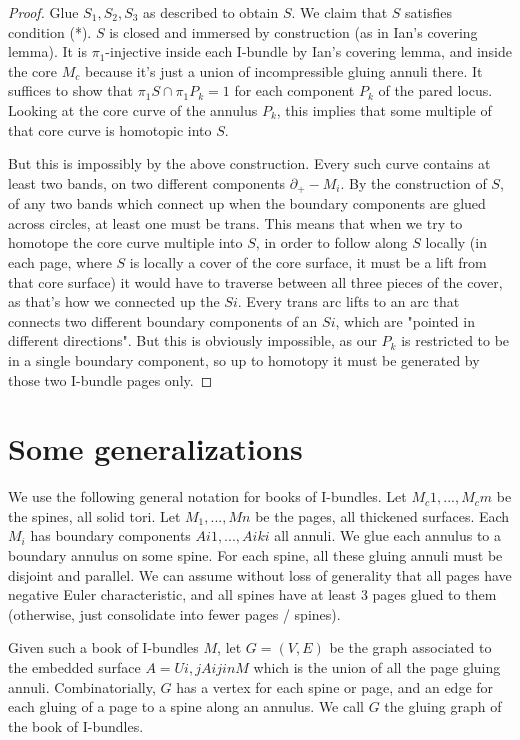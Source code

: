 \documentclass[12pt]{amsart}
\theoremstyle{definition}
\newcommand{\bd}{\partial}
\begin{document}
\begin{proof}
Glue $S_1,S_2,S_3$ as described to obtain $S$. We claim that $S$ satisfies
condition (*). $S$ is closed and immersed by construction (as in Ian's covering
lemma). It is $\pi_1$-injective inside each I-bundle by Ian's covering lemma,
and inside the core $M_c$ because it's just a union of incompressible gluing
annuli there. It suffices to show that $\pi_1S \cap \pi_1P_k = 1$ for each
component $P_k$ of the pared locus. Looking at the core curve of the annulus
$P_k$, this implies that some multiple of that core curve is homotopic into
$S$.

But this is impossibly by the above construction. Every such curve contains at
least two bands, on two different components $\bd_+-M_i$. By the construction
of $S$, of any two bands which connect up when the boundary components are
glued across circles, at least one must be trans. This means that when we try
to homotope the core curve multiple into $S$, in order to follow along $S$
locally (in each page, where $S$ is locally a cover of the core surface, it
must be a lift from that core surface) it would have to traverse between all
three pieces of the cover, as that's how we connected up the $Si$. Every trans
arc lifts to an arc that connects two different boundary components of an $Si$,
which are "pointed in different directions". But this is obviously impossible,
as our $P_k$ is restricted to be in a single boundary component, so up to
homotopy it must be generated by those two I-bundle pages only.

\end{proof}

\section{Some generalizations}

We use the following general notation for books of I-bundles. Let
$M_c1,...,M_cm$ be the spines, all solid tori. Let $M_1,...,Mn$ be the pages,
all thickened surfaces. Each $M_i$ has boundary components $Ai1,...,Aiki$ all
annuli. We glue each annulus to a boundary annulus on some spine. For each
spine, all these gluing annuli must be disjoint and parallel. We can assume
without loss of generality that all pages have negative Euler characteristic,
and all spines have at least
3 pages glued to them (otherwise, just consolidate into fewer pages / spines).

Given such a book of I-bundles $M$, let $G=(V,E)$ be the graph associated to
the embedded surface $A = Ui,j Aij in M$ which is the union of all the page
gluing annuli. Combinatorially, $G$ has a vertex for each spine or page, and an
edge for each gluing of a page to a spine along an annulus. We call $G$ the
gluing graph of the book of I-bundles.
\end{document}
